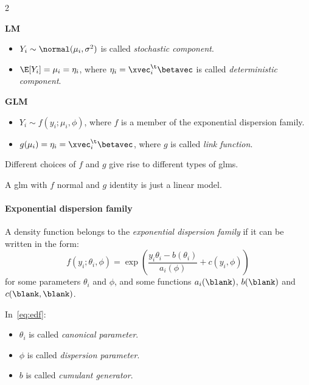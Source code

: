 \begin{multicols}{2}
    \begin{center}
        \textbf{LM}
    \end{center}
    \begin{itemize}
        \item $Y_i \sim \normal(\mu_i, \sigma^2)$ is called \emph{stochastic component}.
        \item $\E[Y_i] = \mu_i = \eta_i$, where $\eta_i = \xvec_i^\t\betavec$ is called \emph{deterministic component}.
    \end{itemize}

    \columnbreak

    \begin{center}
        \textbf{GLM}
    \end{center}
    \begin{itemize}
        \item $Y_i \sim f(y_i; \mu_i, \phi)$, where $f$ is a member of the exponential dispersion family.
        \item $g(\mu_i) = \eta_i = \xvec_i^\t\betavec$, where $g$ is called \emph{link function}.
    \end{itemize}
\end{multicols}
Different choices of $f$ and $g$ give rise to different types of \acsp{glm}.

\begin{example}
    A \acs{glm} with $f$ normal and $g$ identity is just a linear model.
\end{example}

\paragraph{Exponential dispersion family}

\begin{definition*}
    A density function belongs to the \emph{exponential dispersion family} if it can be written in the form:
    \begin{equation}\label{eq:edf}
        f(y_i; \theta_i, \phi) = \exp\left(\frac{y_i\theta_i - b(\theta_i)}{a_i(\phi)} + c(y_i, \phi)\right)
    \end{equation}
    for some parameters $\theta_i$ and $\phi$, and some functions $a_i(\blank)$, $b(\blank)$ and $c(\blank, \blank)$.
\end{definition*}

In~\eqref{eq:edf}:
\begin{itemize}
    \item $\theta_i$ is called \emph{canonical parameter}.
    \item $\phi$ is called \emph{dispersion parameter}.
    \item $b$ is called \emph{cumulant generator}.
\end{itemize}

